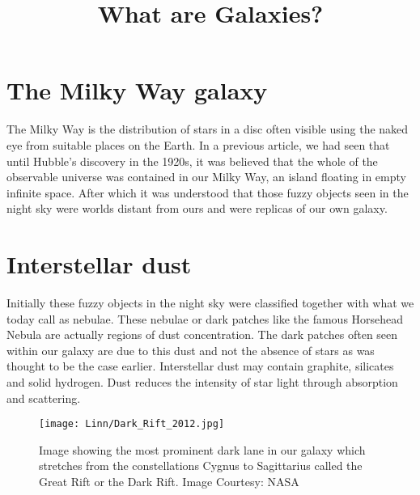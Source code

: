 \documentclass{../template/texnote}
\title{\textbf{What are Galaxies?}}
\begin{document}
    \maketitle {}
\section{The Milky Way galaxy}
The Milky Way is the distribution of stars in a disc often visible using the naked eye from suitable places on the Earth.
In a previous article, we had seen that until Hubble's discovery in the 1920s, it was believed that the whole of the observable universe was contained in our Milky Way, an island floating in empty infinite space.
After which it was understood that those fuzzy objects seen in the night sky were worlds distant from ours and were replicas of our own galaxy.
\section{Interstellar dust}
Initially these fuzzy objects in the night sky were classified together with what we today call as nebulae.
These nebulae or dark patches like the famous Horsehead Nebula are actually regions of dust concentration.%
The dark patches often seen within our galaxy are due to this dust and not the absence of stars as was thought to be the case earlier.
Interstellar dust may contain graphite, silicates and solid hydrogen.
Dust reduces the intensity of star light through absorption and scattering.
	\begin{figure}
	\begin{center}
		\texttt{[image: Linn/Dark\_Rift\_2012.jpg]}
	\end{center}
	\caption{Image showing the most prominent dark lane in our galaxy which stretches from the constellations Cygnus to Sagittarius called the Great Rift or the Dark Rift. Image Courtesy: NASA}
	\label{fig:galaxy}
	\end{figure}
	
\end{document}
